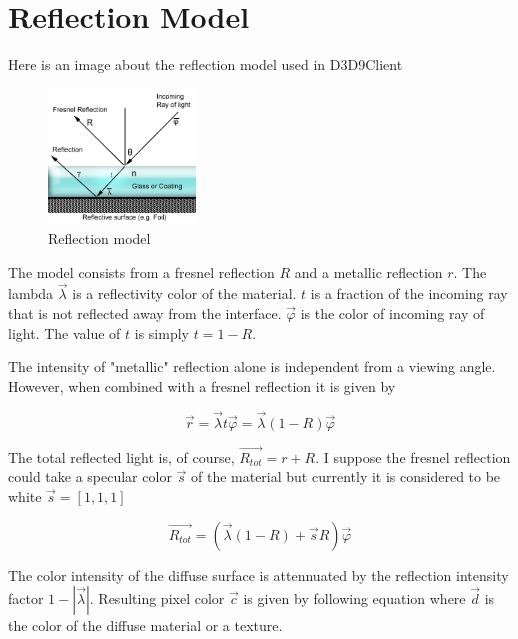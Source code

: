 \documentclass[twocolumn]{report}
\newenvironment{twocol}[0]{%
\begin{list}{}{%
\onecolumn
\setlength{\leftmargin}{0.15cm}%
\setlength{\rightmargin}{0.15cm}%
\setlength{\topmargin}{0cm}%
\setlength{\headheight}{0cm}%
\setlength{\headsep}{0cm}%
\setlength{\textheight}{24cm}%
}%
\item[]}{\end{list}}
\begin{document}
\begin{twocol}

\section*{Reflection Model}

Here is an image about the reflection model used in D3D9Client

\begin{figure}[h]
	\centering
	\includegraphics[width=0.35\textwidth]{images/Fresnel.png}
	\caption{Reflection model}
\end{figure}

The model consists from a fresnel reflection $R$ and a metallic reflection $r$. The lambda $\vec{\lambda}$ is a reflectivity color of the material. $t$ is a fraction of the incoming ray that is not reflected away from the interface. $\vec{\varphi}$ is the color of incoming ray of light. The value of $t$ is simply $t=1-R$.

The intensity of "metallic" reflection alone is independent from a viewing angle. However, when combined with a fresnel reflection it is given by

\begin{equation}
 \vec{r} = \vec{\lambda}t\vec{\varphi} = \vec{\lambda}(1-R)\vec{\varphi}
\end{equation}

The total reflected light is, of course, $\vec{R_{tot}}=r+R$. I suppose the fresnel reflection could take a specular color $\vec{s}$ of the material but currently it is considered to be white $\vec{s}=[1,1,1]$

\begin{equation}
\vec{R_{tot}} = (\vec{\lambda}(1-R)+\vec{s}R)\vec{\varphi}
\end{equation}

The color intensity of the diffuse surface is attennuated by the reflection intensity factor $1-|\vec{\lambda}|$. Resulting pixel color $\vec{c}$ is given by following equation where $\vec{d}$ is the color of the diffuse material or a texture.


\end{twocol}
\end{document}
